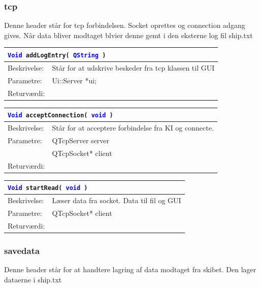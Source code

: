 \subsubsection{tcp}
Denne header står for tcp forbindelsen. Socket oprettes og connection adgang gives. Når data bliver modtaget blvier denne gemt i den eksterne log fil ship.txt

\begin{table}[H]
\begin{tabular}{l p{12.5cm}}
\multicolumn{2}{l}{\texttt{\textcolor{blue}{Void} addLogEntry( \textcolor{blue}{QString} )}} \\
\hline
Beskrivelse: & Står for at udskrive beskeder fra tcp klassen til GUI \\
Parametre: & Ui::Server *ui;\\
Returværdi:&\\
\end{tabular}
\end{table}

\begin{table}[H]
\begin{tabular}{l p{12.5cm}}
\multicolumn{2}{l}{\texttt{\textcolor{blue}{Void} acceptConnection( \textcolor{blue}{void} )}} \\
\hline
Beskrivelse:&Står for at acceptere forbindelse fra KI og connecte.\\
Parametre:&QTcpServer server\\
				&QTcpSocket* client\\
Returværdi:&\\
\end{tabular}
\end{table}

\begin{table}[H]
\begin{tabular}{l p{12.5cm}}
\multicolumn{2}{l}{\texttt{\textcolor{blue}{Void} startRead( \textcolor{blue}{void} )}} \\
\hline
Beskrivelse:&Læser data fra socket. Data til fil og GUI\\
Parametre:&QTcpSocket* client\\
Returværdi:&\\
\end{tabular}
\end{table}

\subsubsection{savedata}
Denne header står for at handtere lagring af data modtaget fra skibet. Den lager dataerne i ship.txt


